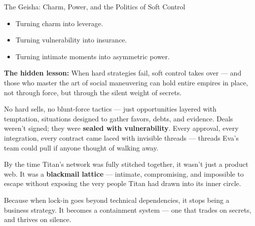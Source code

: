 \begin{HistoricalSidebar}{The Geisha: Charm, Power, and the Politics of Soft Control}
    \medskip

    \begin{itemize}
        \item Turning charm into leverage.
        \item Turning vulnerability into insurance.
        \item Turning intimate moments into asymmetric power.
    \end{itemize}
    
    \medskip
    
    \textbf{The hidden lesson:}  
    When hard strategies fail, soft control takes over —  
    and those who master the art of social maneuvering can hold entire empires in place, not through force, but through the silent weight of secrets.
    
\end{HistoricalSidebar}

\medskip


No hard sells, no blunt-force tactics — just opportunities layered with temptation, situations designed to gather favors, debts, and evidence.
Deals weren’t signed; they were \textbf{sealed with vulnerability}.
Every approval, every integration, every contract came laced with invisible threads — threads Eva’s team could pull if anyone thought of walking away.

By the time Titan’s network was fully stitched together, it wasn’t just a product web.
It was a \textbf{blackmail lattice} — intimate, compromising, and impossible to escape without exposing the very people Titan had drawn into its inner circle.

Because when lock-in goes beyond technical dependencies, it stops being a business strategy.
It becomes a containment system —
one that trades on secrets, and thrives on silence.

\medskip

